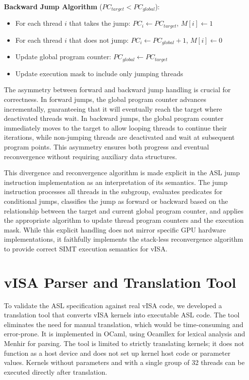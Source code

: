 \textbf{Backward Jump Algorithm} ($PC_{target} < PC_{global}$):
\begin{itemize}
    \item For each thread $i$ that takes the jump: $PC_i
    \leftarrow PC_{target}$, $M[i] \leftarrow 1$
    \item For each thread $i$ that does not jump: $PC_i \leftarrow PC_{global}
    + 1$, $M[i] \leftarrow 0$
    \item Update global program counter: $PC_{global} \leftarrow PC_{target}$
    \item Update execution mask to include only jumping threads
\end{itemize}

The asymmetry between forward and backward jump handling is crucial for
correctness. In forward jumps, the global program counter advances
incrementally, guaranteeing that it will eventually reach the target where
deactivated threads wait. In backward jumps, the global program counter
immediately moves to the target to allow looping threads to continue their
iterations, while non-jumping threads are deactivated and wait at subsequent
program points. This asymmetry ensures both progress and eventual reconvergence
without requiring auxiliary data structures.

This divergence and reconvergence algorithm is made explicit in the ASL jump
instruction implementation as an interpretation of its semantics. The jump
instruction processes all threads in the subgroup, evaluates predicates for
conditional jumps, classifies the jump as forward or backward based on the
relationship between the target and current global program counter, and applies
the appropriate algorithm to update thread program counters and the execution
mask. While this explicit handling does not mirror specific GPU hardware
implementations, it faithfully implements the stack-less reconvergence
algorithm to provide correct SIMT execution semantics for vISA.

\chapter{vISA Parser and Translation Tool}

To validate the ASL specification against real vISA code, we developed a
translation tool that converts vISA kernels into executable ASL code. The tool
eliminates the need for manual translation, which would be time-consuming and
error-prone. It is implemented in OCaml, using Ocamllex for lexical analysis
and Menhir for parsing. The tool is limited to strictly translating kernels; it
does not function as a host device and does not set up kernel host code or
parameter values. Kernels without parameters and with a single group of 32
threads can be executed directly after translation.

